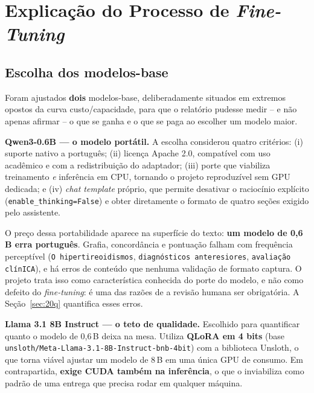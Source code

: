 \documentclass[12pt,a4paper]{article}
\begin{document}
\section{Explicação do Processo de \emph{Fine-Tuning}}
\label{sec:finetuning}

\subsection{Escolha dos modelos-base}
\label{sec:escolha}

Foram ajustados \textbf{dois} modelos-base, deliberadamente situados em extremos
opostos da curva custo/capacidade, para que o relatório pudesse medir -- e não
apenas afirmar -- o que se ganha e o que se paga ao escolher um modelo maior.

\medskip
\noindent\textbf{Qwen3-0.6B --- o modelo portátil.} A escolha considerou quatro
critérios: (i) suporte nativo a português; (ii) licença Apache 2.0, compatível
com uso acadêmico e com a redistribuição do adaptador; (iii) porte que viabiliza
treinamento \emph{e} inferência em CPU, tornando o projeto reproduzível sem GPU
dedicada; e (iv) \emph{chat template} próprio, que permite desativar o raciocínio
explícito (\texttt{enable\_thinking=False}) e obter diretamente o formato de
quatro seções exigido pelo assistente.

O preço dessa portabilidade aparece na superfície do texto: \textbf{um modelo de
0,6\,B erra português}. Grafia, concordância e pontuação falham com frequência
perceptível (\texttt{O hipertireoidismos}, \texttt{diagnósticos anteresiores},
\texttt{avaliação clínICA}), e há erros de conteúdo que nenhuma validação de
formato captura. O projeto trata isso como característica conhecida do porte do
modelo, e não como defeito do \emph{fine-tuning}: é uma das razões de a revisão
humana ser obrigatória. A Seção~\ref{sec:20q} quantifica esses erros.

\medskip
\noindent\textbf{Llama 3.1 8B Instruct --- o teto de qualidade.} Escolhido para
quantificar quanto o modelo de 0,6\,B deixa na mesa. Utiliza \textbf{QLoRA em
4 bits} (base \texttt{unsloth/}\allowbreak\texttt{Meta-}\allowbreak\texttt{Llama-3.1-}\allowbreak\texttt{8B-}\allowbreak\texttt{Instruct-}\allowbreak\texttt{bnb-4bit}) com a
biblioteca Unsloth, o que torna viável ajustar um modelo de 8\,B em uma única GPU
de consumo. Em contrapartida, \textbf{exige CUDA também na inferência}, o que o
inviabiliza como padrão de uma entrega que precisa rodar em qualquer máquina.
\end{document}
